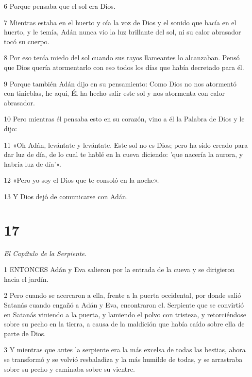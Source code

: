 \par 6 Porque pensaba que el sol era Dios.

\par 7 Mientras estaba en el huerto y oía la voz de Dios y el sonido que hacía en el huerto, y le temía, Adán nunca vio la luz brillante del sol, ni su calor abrasador tocó su cuerpo.

\par 8 Por eso tenía miedo del sol cuando sus rayos llameantes lo alcanzaban. Pensó que Dios quería atormentarlo con eso todos los días que había decretado para él.

\par 9 Porque también Adán dijo en su pensamiento: Como Dios no nos atormentó con tinieblas, he aquí, Él ha hecho salir este sol y nos atormenta con calor abrasador.

\par 10 Pero mientras él pensaba esto en su corazón, vino a él la Palabra de Dios y le dijo:

\par 11 «Oh Adán, levántate y levántate. Este sol no es Dios; pero ha sido creado para dar luz de día, de lo cual te hablé en la cueva diciendo: 'que nacería la aurora, y habría luz de día'».

\par 12 «Pero yo soy el Dios que te consoló en la noche».

\par 13 Y Dios dejó de comunicarse con Adán.



\chapter{17}

\par \textit{El Capítulo de la Serpiente.}

\par 1 ENTONCES Adán y Eva salieron por la entrada de la cueva y se dirigieron hacia el jardín.

\par 2 Pero cuando se acercaron a ella, frente a la puerta occidental, por donde salió Satanás cuando engañó a Adán y Eva, encontraron el. Serpiente que se convirtió en Satanás viniendo a la puerta, y lamiendo el polvo con tristeza, y retorciéndose sobre su pecho en la tierra, a causa de la maldición que había caído sobre ella de parte de Dios.

\par 3 Y mientras que antes la serpiente era la más excelsa de todas las bestias, ahora se transformó y se volvió resbaladiza y la más humilde de todas, y se arrastraba sobre su pecho y caminaba sobre su vientre.

